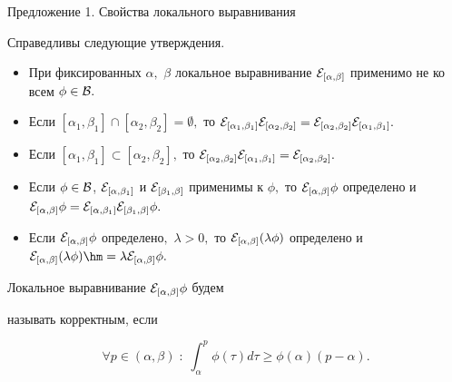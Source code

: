 \smallskip



\begin{newthm}{Предложение 1. Свойства локального выравнивания}

Справедливы следующие утверждения.

\begin{itemize}

\item[\rm 1.] При фиксированных $\alpha,$ $\beta$ локальное выравнивание ${\cal E}_{[\alpha,\beta]}$ применимо не ко всем $\phi\in{\cal B}.$

\item[\rm 2.] Если $[\alpha_1,\beta_1]\cap[\alpha_2,\beta_2]=\emptyset,$ то ${\cal E}_{[\alpha_1,\beta_1]}{\cal E}_{[\alpha_2,\beta_2]}={\cal E}_{[\alpha_2,\beta_2]}{\cal E}_{[\alpha_1,\beta_1]}.$

\item[\rm 3.] Если $[\alpha_1,\beta_1]\subset[\alpha_2,\beta_2],$ то ${\cal E}_{[\alpha_2,\beta_2]}{\cal E}_{[\alpha_1,\beta_1]}={\cal E}_{[\alpha_2,\beta_2]}.$

\item[\rm 4.] Если $\phi\in{\cal B}$, ${\cal E}_{[\alpha,\beta_1]}$ и ${\cal E}_{[\beta_1,\beta]}$ применимы к $\phi,$ то ${\cal E}_{[\alpha,\beta]}\phi$ определено  и ${\cal E}_{[\alpha,\beta]}\phi={\cal E}_{[\alpha,\beta_1]}{\cal E}_{[\beta_1,\beta]}\phi.$

\item[\rm 5.] Если ${\cal E}_{[\alpha,\beta]}\phi$ определено$,$ $\lambda>0,$ то ${\cal E}_{[\alpha,\beta]}(\lambda\phi)$ определено и ${\cal E}_{[\alpha,\beta]}(\lambda\phi)\hm=\lambda{\cal E}_{[\alpha,\beta]}\phi.$

\end{itemize}

\end{newthm}



\smallskip



\hypertarget{palin:definition6}{}



\begin{definition}[6]Локальное выравнивание ${\cal E}_{[\alpha,\beta]}\phi$ будем

называть корректным, если

$$\forall p\in(\alpha,\beta)\;:\;\int_{\alpha}^p\phi(\tau)d\tau\ge\phi(\alpha)(p-\alpha).$$

\end{definition}



